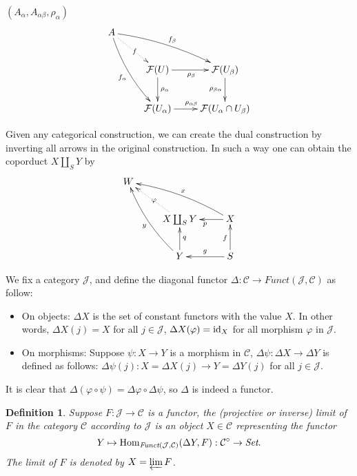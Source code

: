 \documentclass[10pt]{article}
\theoremstyle{plain}
\newtheorem{defi}{Definition}
\newcommand{\cc}{\mathcal{C}}
\begin{document}
$(A_\alpha,A_{\alpha\beta},\rho_{\alpha})$
\[
\begin{xy}
	\xymatrix{
		A \ar@/_/[ddr]_{f_\alpha} \ar@{.>}[dr]|{f} \ar@/^/[drr]^{f_\beta} \\  
	 	& \calf(U) \ar[d]^{\rho_\alpha} \ar[r]_{\rho_\beta} & \calf(U_\beta) \ar[d]_{\rho_{\beta\alpha}} \\
	 	& \calf(U_\alpha) \ar[r]^{\rho_{\alpha\beta}} & \calf(U_{\alpha}\cap U_\beta)
	}
\end{xy}
\]

Given any categorical construction, we can create the dual construction by inverting all arrows in the original construction. In such a way one can obtain the coporduct $X\coprod_S Y$ by
\[
\begin{xy}
	\xymatrix{
		W\\  
	 	& X \coprod_S Y \ar@{.>}[lu]|{\varphi} & X \ar[l]^p\ar@/_/[ull]_x  \\
	 	& Y \ar@/^/[uul]^y  \ar[u]_q& S\ar[u]^f\ar[l]_g
	}
\end{xy}
\]


We fix a category $\mathcal{J}$, and define the diagonal functor $\Delta:\cc\to \textit{Funct}(\mathcal{J},\cc)$ as follow:
\begin{itemize}
\item On objects: $\Delta X$ is the set of constant functors with the value $X$. In other words, $\Delta X(j)=X$ for all $j\in\mathcal{J}$, $\Delta X(\varphi)=\operatorname{id}_X$ for all morphism $\varphi$ in $\mathcal{J}$.
\item On morphisms: Suppose $\psi:X\to Y$ is a morphism in $\cc$, $\Delta\psi:\Delta X\to \Delta Y$ is defined as follows: $\Delta\psi(j):X=\Delta X(j)\to Y=\Delta Y(j)$ for all $j\in \mathcal{J}$.
\end{itemize}
It is clear that $\Delta(\varphi\circ\psi)=\Delta\varphi\circ\Delta\psi$, so $\Delta$ is indeed a functor.

\begin{defi}
	Suppose $F:\mathcal{J}\to \cc$ is a functor, the (projective or inverse) limit of $F$ in the category $\cc$ according to $\mathcal{J}$ is an object $X\in\cc$ representing the functor
	\[
		Y\mapsto \Hom_{\textit{Funct}(\mathcal{J},\cc)}(\Delta Y,F):\cc^\circ\to \textit{Set}.
	\]
	The limit of $F$ is denoted by $X=\varprojlim F$.
\end{defi}
\end{document}
